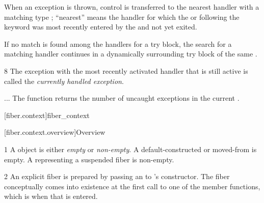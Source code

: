 
When an exception is thrown, control is transferred to the nearest handler
with a matching type ; ``nearest'' means the handler for
which the  or
 following the  keyword was
most recently entered by the  and
not yet exited.




If no match is found among the handlers for a try block, the search for a
matching handler continues in a dynamically surrounding try block of the same
.


8 The exception with the most recently activated handler  that is
still active is called the
\emph{currently handled exception}.


... The function 
returns the number of uncaught exceptions in the current .


\setcounter{section}{33}
\setcounter{subsection}{11}
\setcounter{secnumdepth}{4}

\cbstart

[fiber.context]{fiber\_context}

[fiber.context.overview]{Overview}

1 A \fiber object is either \emph{empty} or \emph{non-empty}. A
default-constructed or moved-from \fiber is empty. A \fiber
representing a suspended fiber is non-empty.

2 An explicit fiber is prepared by passing an \emph{\entryfn} to \fiber's
constructor. The fiber conceptually comes into existence at the first call to
one of the \anyresume member functions, which is when that \entryfn is
entered.

